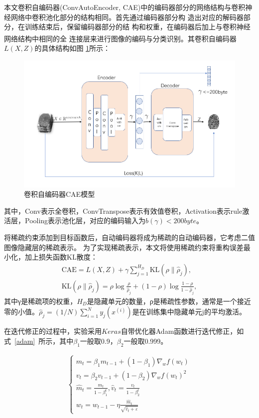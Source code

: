 \documentclass{whutmod}
\newcommand{\upcite}[1]{\textsuperscript{\cite{#1}}}
\begin{document}
			本文卷积自编码器(ConvAutoEncoder, CAE)中的编码器部分的网络结构与卷积神
			经网络中卷积池化部分的结构相同。首先通过编码器部分构
			造出对应的解码器部分，在训练结束后，保留编码器部分的结
			构和权重，在编码器后加上与卷积神经网络结构中相同的全
			连接层来进行图像的编码与分类识别\upcite{12,13}。其卷积自编码器$L(X,Z)$的具体结构如图
			\ref{labssel}所示：
					\begin{figure}[H]
				\centering
				\includegraphics[width=\textwidth]{figures/model.png}
				\caption{卷积自编码器CAE模型}\label{labssel}
			\end{figure}
		其中，Conv表示全卷积，ConvTranspose表示有效值卷积，Activation表示rule激活层，Pooling表示池化层，对应的编码输入为$b(\gamma)<200byte$。
		
	
					将稀疏约束添加到目标函数后，自动编码器将成为稀疏的自动编码器，它考虑二值图像隐藏层的稀疏表示。 为了实现稀疏表示，本文将使用稀疏约束将重构误差最小化，加上损失函数KL散度：
								\begin{gather}
					 \mathrm{CAE}=L(X, Z)+\gamma \sum_{j=1}^{H_{D}} \mathrm{KL}\left(\rho \| \hat{\rho}_{j}\right),\\
					 \mathrm{KL}\left(\rho \| \hat{\rho}_{j}\right)=\rho \log \frac{\rho}{\hat{\rho}_{j}}+(1-\rho) \log \frac{1-\rho}{1-\hat{\rho}_{j}},
								\end{gather}
					其中γ是稀疏项的权重，$H_D$是隐藏单元的数量，ρ是稀疏性参数，通常是一个接近零的小值。$\hat{\rho}_{j}=(1 / N) \sum_{i=1}^{N} y_{j}\left(x^{(i)}\right)$是在训练集中隐藏单元j的平均激活。

在迭代修正的过程中，实验采用$Keras$自带优化器Adam函数进行迭代修正，如式~\ref{adam}~所示，其中$\beta_{1}$一般取0.9，$\beta_{2}$一般取0.999。

\begin{gather*}\label{adam}
\left\{\begin{array}{l}{m_{t}=\beta_{1} m_{t-1}+\left(1-\beta_{1}\right) \nabla_{w} f\left(w_{t}\right)} \\ {v_{t}=\beta_{2} v_{t-1}+\left(1-\beta_{2}\right) \nabla_{w} f\left(w_{t}\right)^{2}} \\ {\widehat{m}_{t}=\frac{m_{t}}{1-\beta_{1}^{t}}, \hat{v}_{t}=\frac{v_{t}}{1-\beta_{2}^{t}}} \\ {w_{t}=w_{t-1}-\eta \frac{\widehat{m}_{t}}{\sqrt{\hat{v}_{t}+\varepsilon}}}\end{array}\right.
\end{gather*}
\end{document}
